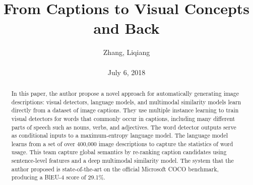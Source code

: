 \documentclass[10pt,twocolumn,letterpaper]{article}
\title{\textbf{From Captions to Visual Concepts and Back}}
\author{Zhang, Liqiang\\\\July 6, 2018}
\begin{document}
\maketitle
\par
\begin{abstract}
In this paper, the author propose a novel approach for automatically generating image descriptions:  visual detectors, language models, and  multimodal similarity models learn directly from a dataset of image captions. They use multiple instance learning to train visual detectors for words that commonly occur in captions, including many different parts of speech such as nouns, verbs, and adjectives. The word detector outputs serve as conditional inputs to a maximum-entropy language model. The language model learns from a set of over 400,000 image descriptions to capture the statistics of word usage. This team capture global semantics by re-ranking caption candidates using sentence-level features and a deep multimodal similarity model. The system that the author proposed is state-of-the-art on the official Microsoft COCO benchmark, producing a BlEU-4 score of 29.1\%. 
\end{abstract}
\end{document}
